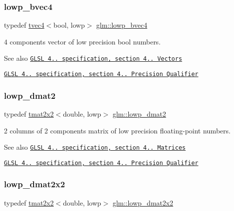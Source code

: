 \subsubsection{\texorpdfstring{lowp\+\_\+bvec4}{lowp\_bvec4}}
{\footnotesize\ttfamily typedef \hyperlink{structglm_1_1tvec4}{tvec4}$<$bool, lowp$>$ \hyperlink{group__core__precision_ga512926597aea7a1afe60ee7b983db86d}{glm\+::lowp\+\_\+bvec4}}

4 components vector of low precision bool numbers.

\begin{DoxySeeAlso}{See also}
\href{http://www.opengl.org/registry/doc/GLSLangSpec.4.20.8.pdf}{\tt G\+L\+SL 4.. specification, section 4.. Vectors} 

\href{http://www.opengl.org/registry/doc/GLSLangSpec.4.20.8.pdf}{\tt G\+L\+SL 4.. specification, section 4.. Precision Qualifier} 
\end{DoxySeeAlso}
\mbox{\label{group__core__precision_ga42a83e53bbcc740b6ae501fec19dda69}} 
\subsubsection{\texorpdfstring{lowp\+\_\+dmat2}{lowp\_dmat2}}
{\footnotesize\ttfamily typedef \hyperlink{structglm_1_1tmat2x2}{tmat2x2}$<$double, lowp$>$ \hyperlink{group__core__precision_ga42a83e53bbcc740b6ae501fec19dda69}{glm\+::lowp\+\_\+dmat2}}

2 columns of 2 components matrix of low precision floating-\/point numbers.

\begin{DoxySeeAlso}{See also}
\href{http://www.opengl.org/registry/doc/GLSLangSpec.4.20.8.pdf}{\tt G\+L\+SL 4.. specification, section 4.. Matrices} 

\href{http://www.opengl.org/registry/doc/GLSLangSpec.4.20.8.pdf}{\tt G\+L\+SL 4.. specification, section 4.. Precision Qualifier} 
\end{DoxySeeAlso}
\mbox{\label{group__core__precision_ga62d3af99b9e0659d693c80b75df9a35c}} 
\subsubsection{\texorpdfstring{lowp\+\_\+dmat2x2}{lowp\_dmat2x2}}
{\footnotesize\ttfamily typedef \hyperlink{structglm_1_1tmat2x2}{tmat2x2}$<$double, lowp$>$ \hyperlink{group__core__precision_ga62d3af99b9e0659d693c80b75df9a35c}{glm\+::lowp\+\_\+dmat2x2}}

